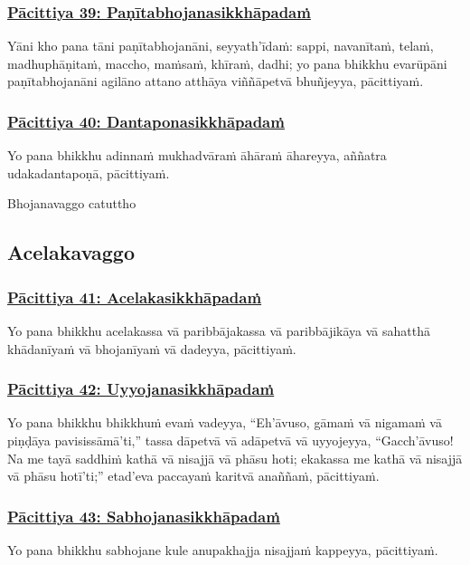 \subsubsection*{\hyperref[exp39]{Pācittiya 39: Paṇītabhojanasikkhāpadaṁ}}
\label{pac39}
Yāni kho pana tāni paṇītabhojanāni, seyyath'īdaṁ: sappi, navanītaṁ, telaṁ, madhuphāṇitaṁ, maccho, maṁsaṁ, khīraṁ, dadhi; yo pana bhikkhu evarūpāni paṇītabhojanāni agilāno attano atthāya viññāpetvā bhuñjeyya, pācittiyaṁ.

\subsubsection*{\hyperref[exp40]{Pācittiya 40: Dantaponasikkhāpadaṁ}}
\label{pac40}
Yo pana bhikkhu adinnaṁ mukhadvāraṁ āhāraṁ āhareyya, aññatra udakadantapoṇā, pācittiyaṁ.

\begin{center}
  Bhojanavaggo catuttho
\end{center}

\subsection{Acelakavaggo}
\vspace{0.2cm}

\subsubsection*{\hyperref[exp41]{Pācittiya 41: Acelakasikkhāpadaṁ}}
\label{pac41}
Yo pana bhikkhu acelakassa vā paribbājakassa vā paribbājikāya vā sahatthā khādanīyaṁ vā bhojanīyaṁ vā dadeyya, pācittiyaṁ.

\subsubsection*{\hyperref[exp42]{Pācittiya 42: Uyyojanasikkhāpadaṁ}}
\label{pac42}
Yo pana bhikkhu bhikkhuṁ evaṁ vadeyya, ``Eh'āvuso, gāmaṁ vā nigamaṁ vā piṇḍāya pavisissāmā'ti,'' tassa dāpetvā vā adāpetvā vā uyyojeyya, ``Gacch'āvuso! Na me tayā saddhiṁ kathā vā nisajjā vā phāsu hoti; ekakassa me kathā vā nisajjā vā phāsu hotī'ti;'' etad'eva paccayaṁ karitvā anaññaṁ, pācittiyaṁ.

\subsubsection*{\hyperref[exp43]{Pācittiya 43: Sabhojanasikkhāpadaṁ}}
\label{pac43}
Yo pana bhikkhu sabhojane kule anupakhajja nisajjaṁ kappeyya, pācittiyaṁ.

